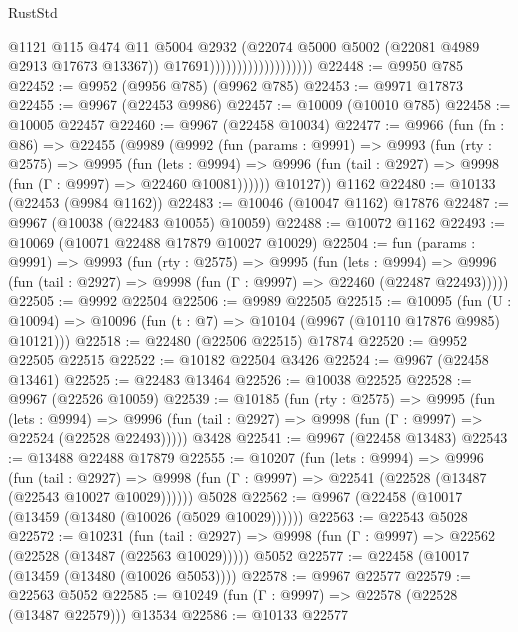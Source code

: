 \begin{lexlean}{RustStd}
\begin{coremodule}
                                          @1121
                                          @115
                                          @474
                                          @11
                                          @5004
                                          @2932
                                          (@22074 @5000 @5002 (@22081 @4989 @2913 @17673 @13367))
                                          @17691)))))))))))))))))))
@22448 := @9950 @785
@22452 := @9952 (@9956 @785) (@9962 @785)
@22453 := @9971 @17873
@22455 := @9967 (@22453 @9986)
@22457 := @10009 (@10010 @785)
@22458 := @10005 @22457
@22460 := @9967 (@22458 @10034)
@22477 := @9966
    (fun (fn : @86) =>
    @22455
      (@9989
        (@9992
          (fun (params : @9991) =>
          @9993
            (fun (rty : @2575) =>
            @9995
              (fun (lets : @9994) =>
              @9996 (fun (tail : @2927) => @9998 (fun (Γ : @9997) => @22460 @10081))))))
        @10127))
    @1162
@22480 := @10133 (@22453 (@9984 @1162))
@22483 := @10046 (@10047 @1162) @17876
@22487 := @9967 (@10038 (@22483 @10055) @10059)
@22488 := @10072 @1162
@22493 := @10069 (@10071 @22488 @17879 @10027 @10029)
@22504 := fun (params : @9991) =>
  @9993
    (fun (rty : @2575) =>
    @9995
      (fun (lets : @9994) =>
      @9996 (fun (tail : @2927) => @9998 (fun (Γ : @9997) => @22460 (@22487 @22493)))))
@22505 := @9992 @22504
@22506 := @9989 @22505
@22515 := @10095
    (fun (U : @10094) => @10096 (fun (t : @7) => @10104 (@9967 (@10110 @17876 @9985) @10121)))
@22518 := @22480 (@22506 @22515) @17874
@22520 := @9952 @22505 @22515
@22522 := @10182 @22504 @3426
@22524 := @9967 (@22458 @13461)
@22525 := @22483 @13464
@22526 := @10038 @22525
@22528 := @9967 (@22526 @10059)
@22539 := @10185
    (fun (rty : @2575) =>
    @9995
      (fun (lets : @9994) =>
      @9996 (fun (tail : @2927) => @9998 (fun (Γ : @9997) => @22524 (@22528 @22493)))))
    @3428
@22541 := @9967 (@22458 @13483)
@22543 := @13488 @22488 @17879
@22555 := @10207
    (fun (lets : @9994) =>
    @9996
      (fun (tail : @2927) =>
      @9998 (fun (Γ : @9997) => @22541 (@22528 (@13487 (@22543 @10027 @10029))))))
    @5028
@22562 := @9967 (@22458 (@10017 (@13459 (@13480 (@10026 (@5029 @10029))))))
@22563 := @22543 @5028
@22572 := @10231
    (fun (tail : @2927) => @9998 (fun (Γ : @9997) => @22562 (@22528 (@13487 (@22563 @10029)))))
    @5052
@22577 := @22458 (@10017 (@13459 (@13480 (@10026 @5053))))
@22578 := @9967 @22577
@22579 := @22563 @5052
@22585 := @10249 (fun (Γ : @9997) => @22578 (@22528 (@13487 @22579))) @13534
@22586 := @10133 @22577

\end{coremodule}
\end{lexlean}
